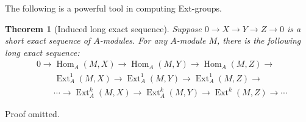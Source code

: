 \documentclass[11pt,a4paper]{article}
\makeatletter
\numberwithin{equation}{section}
\renewenvironment{proof}[1][\proofname]{\par
    \pushQED{\qed}%
    \normalfont \topsep0\p@\@plus6\p@ \labelsep1em\relax
    \trivlist
    \item[\hskip\labelsep\indent
        \bfseries #1]\ignorespaces
    \mbox{}
}{
    \popQED\endtrivlist\@endpefalse
}
\theoremstyle{all}
\newtheorem{theorem}{Theorem}[section]
\theoremstyle{remark}
\newcommand{\Ext}{\operatorname{Ext}\nolimits}
\newcommand{\Hom}{\operatorname{Hom}\nolimits}
\newcommand{\Ker}{\operatorname{Ker}\nolimits}
\newcommand{\defn}[1]{\textsl{\color{darkblue} #1}}
\makeatother
\begin{document}
The following is a powerful tool in computing Ext-groups.

\begin{theorem}[Induced long exact sequence]
Suppose $0\to X\to Y\to Z\to 0$ is a short exact sequence of $A$-modules.
For any $A$-module $M$, there is the following \defn{long exact sequence}:
\begin{align*}
& 0 \to \Hom_A(M,X) \to \Hom_A(M,Y)\to \Hom_A(M,Z) \to \\
& \phantom{0\to}  \Ext_A^1(M,X) \to \Ext_A^1(M,Y) \to \Ext_A^1(M,Z) \to \\
& \qquad \cdots \to \Ext_A^k(M,X) \to \Ext_A^k(M,Y) \to \Ext^k(M,Z) \to \cdots 
\end{align*}
\end{theorem}
Proof omitted.
%
%
%
\end{document}
